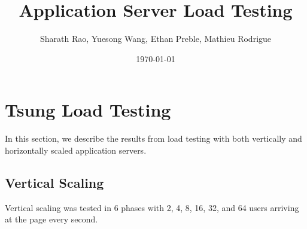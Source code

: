 \documentclass[dvips,12pt]{article}
\begin{document}
\title{Application Server Load Testing}
\author{Sharath Rao, Yuesong Wang, Ethan Preble, Mathieu Rodrigue}
\date{\today}

\maketitle

%

\section{Tsung Load Testing}

In this section, we describe the results from load testing with both vertically and horizontally scaled application servers.

\subsection{Vertical Scaling}

Vertical scaling was tested in 6 phases with 2, 4, 8, 16, 32, and 64 users arriving at the page every second.

\newpage
\end{document}
